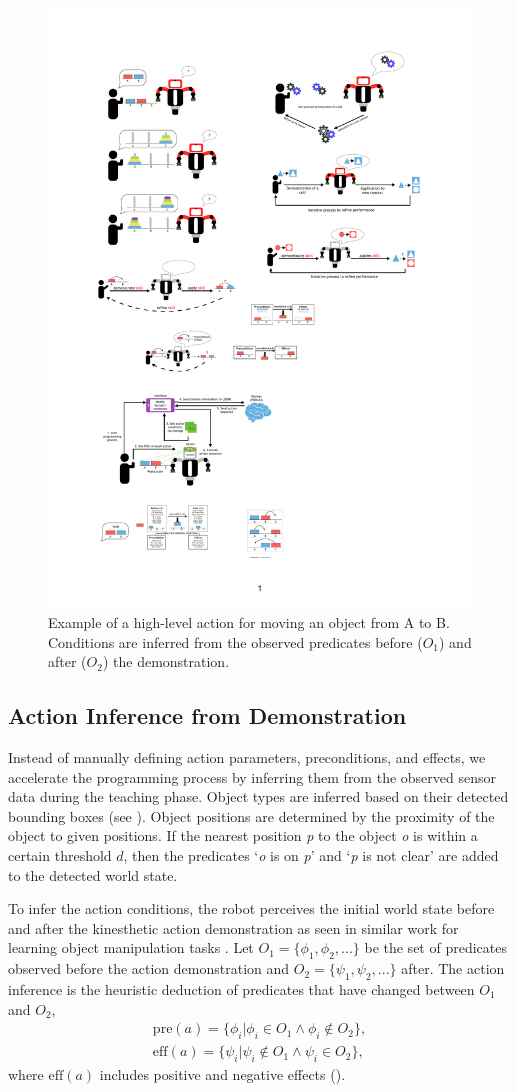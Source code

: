 \begin{figure}
\centering
\includegraphics[width=0.5\linewidth]{figures/high-level.pdf}
\caption{Example of a high-level action for moving an object from A to B. Conditions are inferred from the observed predicates before ($O_1$) and after ($O_2$) the demonstration.
}
\label{fig:action-model}
\end{figure}

\subsection{Action Inference from Demonstration}
\label{sec:inference}
Instead of manually defining action parameters, preconditions, and effects, we accelerate the programming process by inferring them from the observed sensor data during the teaching phase.
Object types are inferred based on their detected bounding boxes (see ).
Object positions are determined by the proximity of the object to given positions.
If the nearest position \emph{p} to the object \emph{o} is within a certain threshold $d$, then the predicates `\emph{o} is on \emph{p}' and `\emph{p} is not clear' are added to the detected world state.

To infer the action conditions, the robot perceives the initial world state   before %
and after the kinesthetic action demonstration as seen in similar work for learning object manipulation tasks \cite{ahmadzadeh2015learning}.
Let $O_1 = \{\phi_1, \phi_2, ... \}$ be the set of predicates observed before the action demonstration and $O_2 = \{\psi_1, \psi_2, ... \}$ after.
The action inference is the heuristic deduction of predicates that have changed between $O_1$ and $O_2$, \ie
\begin{align*} \text{pre}(a) = \{\phi_i | \phi_i \in O_1 \wedge \phi_i \notin O_2 \}, \\
\text{eff}(a) = \{\psi_i | \psi_i \notin O_1 \wedge \psi_i \in O_2 \}, 
\end{align*}
where $\text{eff}(a)$ includes positive and negative effects ().

